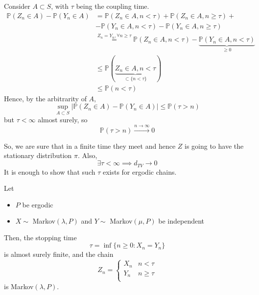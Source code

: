 \documentclass{article}
\begin{document}
        \begin{proof2}
            Consider $A \subset S$, with $\tau$ being the coupling time. 
        \begin{align*}
            \mathbb{P}(Z_n \in A) - \mathbb{P}(Y_n \in A) &= \mathbb{P}(Z_n \in A, n < \tau) + \mathbb{P}(Z_n \in A, n \geq \tau) +\\
            &- \mathbb{P}(Y_n \in A, n < \tau) - \mathbb{P}(Y_n \in A, n \geq \tau) \\
            &\stackrel{Z_n = Y_n, \forall n \geq \tau}= \mathbb{P}(Z_n \in A, n < \tau)- \underbrace{\mathbb{P}(Y_n \in A, n < \tau)}_{\geq 0} \\
            &\leq \mathbb{P}(\underbrace{Z_n \in A, n < \tau}_{\subset \{n < \tau\}})\\
            &\leq \mathbb{P}(n < \tau)
        \end{align*}
        Hence, by the arbitrarity of $A$,
        \begin{equation*}
            \sup_{A \subset S} |\mathbb{P}(Z_n \in A) - \mathbb{P}(Y_n \in A)| \leq \mathbb{P}(\tau > n)
        \end{equation*}
        but $\tau < \infty$ almost surely, so
        \begin{equation*}
            \mathbb{P}(\tau > n) \xrightarrow{n \rightarrow \infty} 0
        \end{equation*}
        \end{proof2}
So, we are sure that in a finite time they meet and hence $Z$ is going to have the stationary distribution $\pi$. Also, 
\begin{equation*}
    \exists \tau < \infty \implies d_{TV} \rightarrow 0
\end{equation*}
It is enough to show that such $\tau$ exists for ergodic chains. 
\begin{theorem}
     Let 
        \begin{itemize}
            \item $P$ be ergodic 
            \item $X \sim$ Markov$(\lambda, P)$ and $Y \sim $ Markov$(\mu, P)$ be independent 
        \end{itemize}
        Then, the stopping time 
        \begin{equation*}
            \tau = \inf\{n \geq 0: X_n = Y_n\}
        \end{equation*}
        is almost surely finite, and the chain
        \[
        Z_n =   
        \begin{cases}
            X_n & n<\tau \\
            Y_n & n \geq \tau \\
        \end{cases}
        \]
        is Markov$(\lambda, P)$.
\end{theorem}
\end{document}
